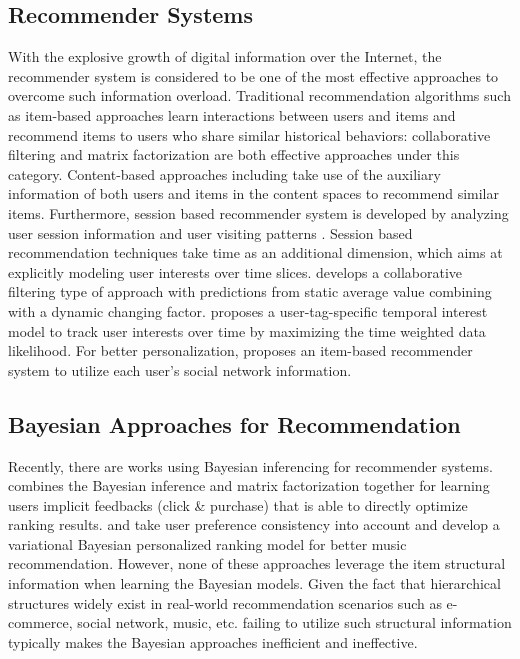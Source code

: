 \subsection{Recommender Systems}

With the explosive growth of digital information over the Internet, the recommender system is considered to be one of the most effective approaches to overcome such information overload. Traditional recommendation algorithms such as item-based approaches learn interactions between users and items and recommend items to users who share similar historical behaviors: collaborative filtering \cite{Sarwar:2001:ICF:371920.372071,Su:2009:SCF:1592474.1722966} and matrix factorization \cite{Rendle:2010:FPM} are both effective approaches under this category.  Content-based approaches including \cite{2011rsh..book...73L,Liu:2011,Yuan:2015} take use of the auxiliary information of both users and items in the content spaces to recommend similar items.  Furthermore, session based recommender system is developed by analyzing user session information and user visiting patterns \cite{Gultekin_acollaborative,Tang_review:2013}. Session based recommendation techniques take time as an additional dimension, which aims at explicitly modeling user interests over time slices. \cite{Koren:2010} develops a collaborative filtering type of approach with predictions from static average value combining with a dynamic changing factor. \cite{Yin:2011} proposes a user-tag-specific temporal interest model to track user interests over time by maximizing the time weighted data likelihood.  For better personalization, \cite{Guy:2009} proposes an item-based recommender system to utilize each user's social network information. 

\subsection{Bayesian Approaches for Recommendation}

Recently, there are works using Bayesian inferencing for recommender systems. \cite{rendle2009bpr} combines the Bayesian inference and matrix factorization together for learning users implicit feedbacks (click \& purchase) that is able to directly optimize ranking results. \cite{Ben-Elazar:2017} and \cite{zhang2007efficient} take user preference consistency into account and develop a variational Bayesian personalized ranking model for better music recommendation.  However, none of these approaches leverage the item structural information when learning the Bayesian models.  Given the fact that hierarchical structures widely exist in real-world recommendation scenarios such as e-commerce, social network, music, etc. failing to utilize such structural information typically makes the Bayesian approaches inefficient and ineffective.  

